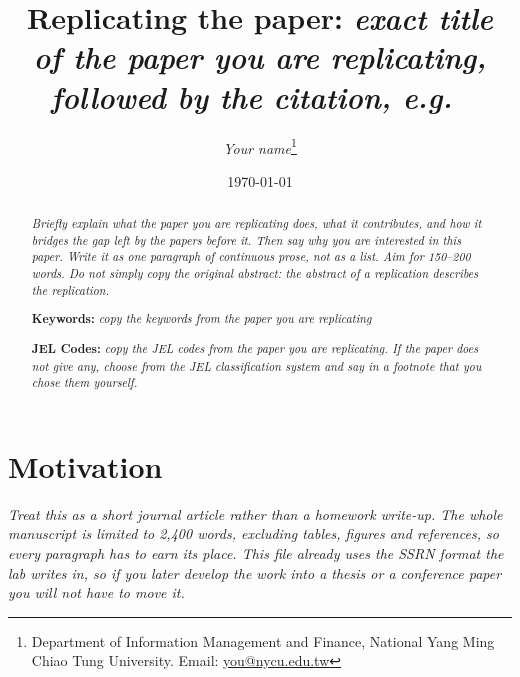 \documentclass[12pt]{article}
\newcommand{\inst}[1]{\textit{#1}}
\begin{document}
\begin{titlepage}

\title{Replicating the paper:
       \inst{exact title of the paper you are replicating, followed by the
       citation, e.g.\ \cite{bitetto2024can}}}

\author{\inst{Your name}\thanks{Department of Information Management and Finance,
        National Yang Ming Chiao Tung University. Email:
        \href{mailto:you@nycu.edu.tw}{you@nycu.edu.tw}}}

\date{\today}
\maketitle

\begin{abstract}
\noindent
\inst{Briefly explain what the paper you are replicating does, what it
contributes, and how it bridges the gap left by the papers before it. Then say
why you are interested in this paper. Write it as one paragraph of continuous
prose, not as a list. Aim for 150--200 words. Do not simply copy the original
abstract: the abstract of a replication describes the replication.}

\vspace{0in}
\noindent\textbf{Keywords:} \inst{copy the keywords from the paper you are replicating}

\vspace{0in}
\noindent\textbf{JEL Codes:} \inst{copy the JEL codes from the paper you are
replicating. If the paper does not give any, choose from the JEL classification
system and say in a footnote that you chose them yourself.}

\bigskip
\end{abstract}

\setcounter{page}{0}
\thispagestyle{empty}
\end{titlepage}
\pagebreak

\newpage
\clearpage


\section{Motivation}
\label{sec:motivation}

\inst{Treat this as a short journal article rather than a homework write-up.
The whole manuscript is limited to 2,400 words, excluding tables, figures and
references, so every paragraph has to earn its place. This file already uses the
SSRN format the lab writes in, so if you later develop the work into a thesis or
a conference paper you will not have to move it.}
\end{document}
